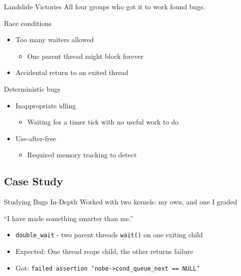 \documentclass[xcolor=dvipsnames]{beamer}
\begin{document}
\begin{frame}{Landslide Victories} %
	All four groups who got it to work found bugs.
	\linegap
	
	Race conditions
	\begin{itemize}
		\item Too many waiters allowed
		\begin{itemize}
			\item One parent thread might block forever
		\end{itemize}
		\item Accidental return to an exited thread
	\end{itemize}
	Deterministic bugs
	\begin{itemize}
		\item Inappropriate idling
		\begin{itemize}
			\item Waiting for a timer tick with no useful work to do
		\end{itemize}
		\item Use-after-free
		\begin{itemize}
			\item Required memory tracking to detect
		\end{itemize}
	\end{itemize}
\end{frame}

\subsection{Case Study}

\begin{frame}{Studying Bugs In-Depth} %
	Worked with two kernels: my own, and one I graded
	\linegap

	``I have made something smarter than me.''
	\begin{itemize}
		\item \texttt{double\_wait} - two parent threads \texttt{wait()} on one exiting child
		\item Expected: One thread reaps child, the other returns failure
		\item Got: \texttt{failed assertion `nobe->cond\_queue\_next == NULL'}
	\end{itemize}
\end{frame}
\end{document}
